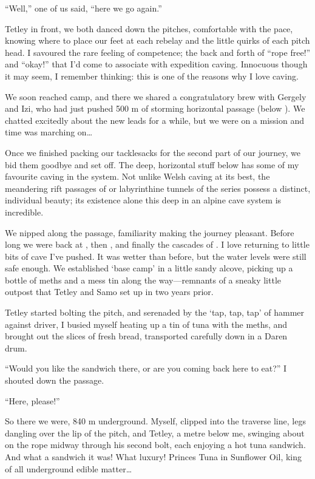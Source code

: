 ``Well,'' one of us said, ``here we go again.''

Tetley in front, we both danced down the pitches, comfortable with the
pace, knowing where to place our feet at each rebelay and the little
quirks of each pitch head. I savoured the rare feeling of competence;
the back and forth of ``rope free!'' and ``okay!'' that I'd come to
associate with expedition caving. Innocuous though it may seem, I
remember thinking: this is one of the reasons why I love caving.

We soon reached camp, and there we shared a congratulatory brew with
Gergely and Izi, who had just pushed 500 m of storming horizontal
passage (below ). We chatted excitedly about the
new leads for a while, but we were on a mission and time was marching
on\ldots{}

Once we finished packing our tacklesacks for the second part of our
journey, we bid them goodbye and set off. The deep, horizontal stuff
below  has some of my favourite caving in
the system. Not unlike Welsh caving at its best, the meandering rift
passages of  or labyrinthine tunnels of the  series
possess a distinct, individual beauty; its existence alone this deep in
an alpine cave system is incredible.

We nipped along the passage, familiarity making the journey pleasant.
Before long we were back at , then , and finally
the cascades of . I love returning to little bits of
cave I've pushed. It was wetter than before, but the water levels were
still safe enough. We established `base camp' in a little sandy alcove,
picking up a bottle of meths and a mess tin along the way---remnants of
a sneaky little outpost that Tetley and Samo set up in  two
years prior.

Tetley started bolting the pitch, and serenaded by the `tap, tap, tap'
of hammer against driver, I busied myself heating up a tin of tuna with
the meths, and brought out the slices of fresh bread, transported
carefully down in a Daren drum.

``Would you like the sandwich there, or are you coming back here to
eat?'' I shouted down the passage.

``Here, please!''

So there we were, 840 m underground. Myself, clipped into the traverse
line, legs dangling over the lip of the pitch, and Tetley, a metre below
me, swinging about on the rope midway through his second bolt, each
enjoying a hot tuna sandwich. And what a sandwich it was! What luxury!
Princes Tuna in Sunflower Oil, king of all underground edible
matter\ldots{}

